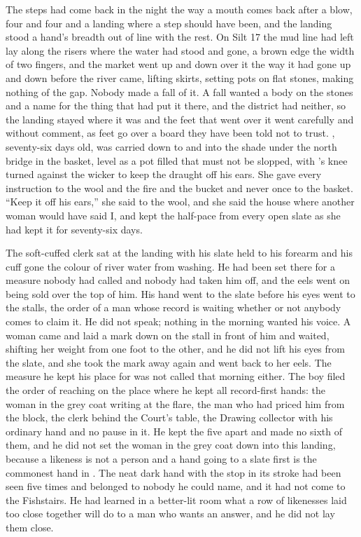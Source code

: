 
The steps had come back in the night the way a mouth comes back after a blow, four and four and a landing where a step should have been, and the landing stood a hand's breadth out of line with the rest. On Silt 17 the mud line  had left lay along the risers where the water had stood and gone, a brown edge the width of two fingers, and the market went up and down over it the way it had gone up and down before the river came, lifting skirts, setting pots on flat stones, making nothing of the gap. Nobody made a fall of it. A fall wanted a body on the stones and a name for the thing that had put it there, and the district had neither, so the landing stayed where it was and the feet that went over it went carefully and without comment, as feet go over a board they have been told not to trust. , seventy-six days old, was carried down to  and into the shade under the north bridge in the basket, level as a pot filled that must not be slopped, with 's knee turned against the wicker to keep the draught off his ears. She gave every instruction to the wool and the fire and the bucket and never once to the basket. “Keep it off his ears,” she said to the wool, and she said the house where another woman would have said I, and kept the half-pace from every open slate as she had kept it for seventy-six days.

The soft-cuffed clerk sat at the landing with his slate held to his forearm and his cuff gone the colour of river water from washing. He had been set there for a measure nobody had called and nobody had taken him off, and the eels went on being sold over the top of him. His hand went to the slate before his eyes went to the stalls, the order of a man whose record is waiting whether or not anybody comes to claim it. He did not speak; nothing in the morning wanted his voice. A woman came and laid a mark down on the stall in front of him and waited, shifting her weight from one foot to the other, and he did not lift his eyes from the slate, and she took the mark away again and went back to her eels. The measure he kept his place for was not called that morning either. The boy filed the order of reaching on the place where he kept all record-first hands: the woman in the grey coat writing at the flare, the man who had priced him from the block, the clerk behind the Court's table, the Drawing collector with his ordinary hand and no pause in it. He kept the five apart and made no sixth of them, and he did not set the woman in the grey coat down into this landing, because a likeness is not a person and a hand going to a slate first is the commonest hand in . The neat dark hand with the stop in its stroke had been seen five times and belonged to nobody he could name, and it had not come to the Fishstairs. He had learned in a better-lit room what a row of likenesses laid too close together will do to a man who wants an answer, and he did not lay them close.

